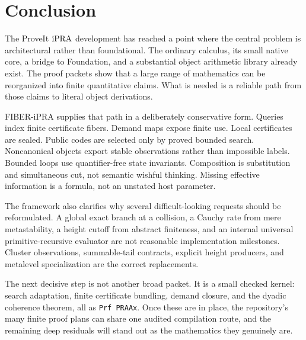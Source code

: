 \section{Conclusion}

The ProveIt \(\mathrm{iPRA}\) development has reached a point where the central
problem is architectural rather than foundational.  The ordinary calculus,
its small native core, a bridge to Foundation, and a substantial object
arithmetic library already exist.  The proof packets show that a large range
of mathematics can be reorganized into finite quantitative claims.  What is
needed is a reliable path from those claims to literal object derivations.

FIBER-iPRA supplies that path in a deliberately conservative form.  Queries
index finite certificate fibers.  Demand maps expose finite use.  Local
certificates are sealed.  Public codes are selected only by proved bounded
search.  Noncanonical objects export stable observations rather than
impossible labels.  Bounded loops use quantifier-free state invariants.
Composition is substitution and simultaneous cut, not semantic wishful
thinking.  Missing effective information is a formula, not an unstated host
parameter.

The framework also clarifies why several difficult-looking requests should be
reformulated.  A global exact branch at a collision, a Cauchy rate from mere
metastability, a height cutoff from abstract finiteness, and an internal
universal primitive-recursive evaluator are not reasonable implementation
milestones.  Cluster observations, summable-tail contracts, explicit height
producers, and metalevel specialization are the correct replacements.

The next decisive step is not another broad packet.  It is a small checked
kernel: search adaptation, finite certificate bundling, demand closure, and
the dyadic coherence theorem, all as \texttt{Prf PRAAx}.  Once these are in
place, the repository's many finite proof plans can share one audited
compilation route, and the remaining deep residuals will stand out as the
mathematics they genuinely are.

